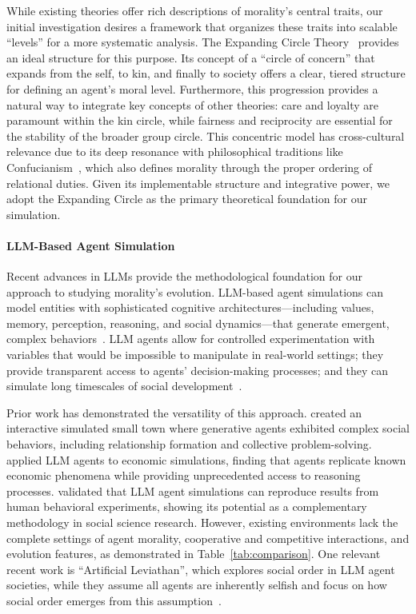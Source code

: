 While existing theories offer rich descriptions of morality's central traits, our initial investigation desires a framework that organizes these traits into scalable ``levels'' for a more systematic analysis. The Expanding Circle Theory~\citep{singer1981expanding} provides an ideal structure for this purpose. Its concept of a ``circle of concern'' that expands from the self, to kin, and finally to society offers a clear, tiered structure for defining an agent's moral level. Furthermore, this progression provides a natural way to integrate key concepts of other theories: care and loyalty are paramount within the kin circle, while fairness and reciprocity are essential for the stability of the broader group circle. This concentric model has cross-cultural relevance due to its deep resonance with philosophical traditions like Confucianism~\citep{fei1992from}, which also defines morality through the proper ordering of relational duties. Given its implementable structure and integrative power, we adopt the Expanding Circle as the primary theoretical foundation for our simulation.

\paragraph{LLM-Based Agent Simulation}

Recent advances in LLMs provide the methodological foundation for our approach to studying morality's evolution. LLM-based agent simulations can model entities with sophisticated cognitive architectures—including values, memory, perception, reasoning, and social dynamics—that generate emergent, complex behaviors~\citep{park2023generative, horton2023large}.
LLM agents allow for controlled experimentation with variables that would be impossible to manipulate in real-world settings; they provide transparent access to agents' decision-making processes; and they can simulate long timescales of social development~\citep{piao2025agentsociety}.

Prior work has demonstrated the versatility of this approach. \citet{park2023generative} created an interactive simulated small town where generative agents exhibited complex social behaviors, including relationship formation and collective problem-solving. \citet{horton2023large} applied LLM agents to economic simulations, finding that agents replicate known economic phenomena while providing unprecedented access to reasoning processes. \citet{aher2023using} validated that LLM agent simulations can reproduce results from human behavioral experiments, showing its potential as a complementary methodology in social science research.
However, existing environments lack the complete settings of agent morality, cooperative and competitive interactions, and evolution features, as demonstrated in Table~\ref{tab:comparison}.
One relevant recent work is ``Artificial Leviathan'', which explores social order in LLM agent societies, while they assume all agents are inherently selfish and focus on how social order emerges from this assumption~\citep{dai2024artificial}.

